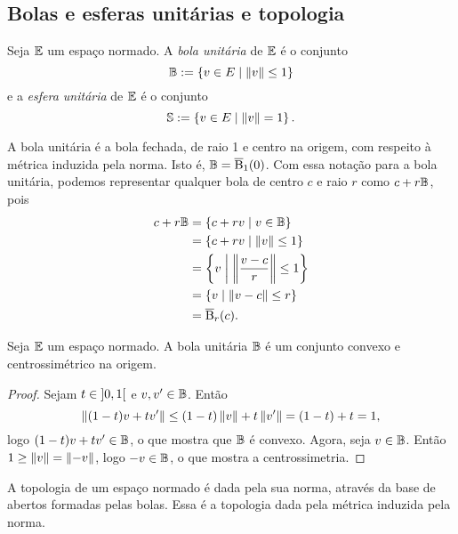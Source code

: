 \subsection{Bolas e esferas unitárias e topologia}

\begin{definition}
Seja $\mathbb{E}$ um espaço normado. A \emph{bola unitária} de $\mathbb{E}$ é o conjunto
	\begin{equation*}
	\mathbb{B} := \left\{{v \in E}\;\middle\vert\;{\left\Vert{v}\right\Vert \leq 1}\right\}
	\end{equation*}
e a \emph{esfera unitária} de $\mathbb{E}$ é o conjunto
	\begin{equation*}
	\mathbb{S} := \left\{{v \in E}\;\middle\vert\;{\left\Vert{v}\right\Vert = 1}\right\}.
	\end{equation*}
\end{definition}

A bola unitária é a bola fechada, de raio 1 e centro na origem, com respeito à métrica induzida pela norma. Isto é, $\mathbb{B} = \overline{\mathrm{B}}_1(0)$. Com essa notação para a bola unitária, podemos representar qualquer bola de centro $c$ e raio $r$ como $c+r\mathbb{B}$, pois
	\begin{align*}
	c+r\mathbb{B} &= \left\{{c+rv}\;\middle\vert\;{v \in \mathbb{B}}\right\} \\
		&= \left\{{c+rv}\;\middle\vert\;{\left\Vert{v}\right\Vert \leq 1}\right\} \\
		&= \left\{{v}\;\middle\vert\;{\left\Vert{\frac{v-c}{r}}\right\Vert \leq 1}\right\} \\
		&= \left\{{v}\;\middle\vert\;{\left\Vert{v-c}\right\Vert \leq r}\right\} \\
		&= \overline{\mathrm{B}}_r(c).
	\end{align*}

\begin{proposition}
Seja $\mathbb{E}$ um espaço normado. A bola unitária $\mathbb{B}$ é um conjunto convexo e centrossimétrico na origem.
\end{proposition}
\begin{proof}
Sejam $t \in \left]{0},{1}\right[$ e $v,v' \in \mathbb{B}$. Então
	\begin{equation*}
	\left\Vert{(1-t)v+tv'}\right\Vert \leq (1-t)\left\Vert{v}\right\Vert+t\left\Vert{v'}\right\Vert =(1-t)+t=1,
	\end{equation*}
logo $(1-t)v+tv' \in \mathbb{B}$, o que mostra que $\mathbb{B}$ é convexo. Agora, seja $v \in \mathbb{B}$. Então $1 \geq \left\Vert{v}\right\Vert = \left\Vert{-v}\right\Vert$, logo $-v \in \mathbb{B}$, o que mostra a centrossimetria.
\end{proof}

A topologia de um espaço normado é dada pela sua norma, através da base de abertos formadas pelas bolas. Essa é a topologia dada pela métrica induzida pela norma.

